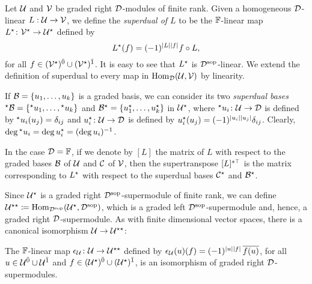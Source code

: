 \begin{defi}\label{defi:superdual-map}
    Let $\mathcal U$ and $\mathcal V$ be graded right $\mathcal{D}$-modules of finite rank. 
    Given a homogeneous $\mathcal{D}$-linear
    $L:\mathcal U \rightarrow \mathcal V$, we define the \emph{superdual of $L$} to be the $\mathbb{F}$-linear map $L^\star\colon \mathcal V^\star \rightarrow \mathcal U^\star$ defined by
    \[
        L^\star (f) = (-1)^{|L||f|} f \circ L,
    \] 
    for all $f\in (\mathcal V^\star)^{\bar0} \cup (\mathcal V^\star)^{\bar1}$. 
    It is easy to see that $L^\star$ is $\mathcal{D}^{\mathrm{sop}}$-linear. 
    We extend the definition of superdual to every map in $\operatorname{Hom}_{\mathcal{D}} (\mathcal U, \mathcal V)$ by linearity.
\end{defi}

\begin{defi}\label{defi:two-dual-bases}
    If $\mathcal B = \{u_1, \ldots, u_k\}$ is a graded basis, we can consider its two \emph{superdual bases} ${}^\star \mathcal B = \{{}^\star u_1, \ldots, {}^\star u_k\}$ and $\mathcal B^\star = \{u_1^\star, \ldots, u_k^\star\}$ in $\mathcal U^\star$, where ${}^\star u_i \colon \mathcal U \rightarrow \mathcal{D}$ is defined by ${}^\star u_i(u_j) = \delta_{ij}$ and $u_i^\star \colon \mathcal U \rightarrow \mathcal{D}$ is defined by $u_i^\star (u_j) = (-1)^{|u_i||u_j|} \delta_{ij}$. 
    Clearly, $\deg {}^\star u_i = \deg  u_i^\star = (\deg u_i)^{-1}$. 
\end{defi}

\begin{remark}
	In the case $\mathcal{D}=\mathbb{F}$, if we denote by $[L]$ the matrix of $L$ with respect to the graded bases $\mathcal B$ of $\mathcal U$ and $\mathcal C$ of $\mathcal V$, then the supertranspose $[L]^{s\top}$ is the matrix corresponding to $L^\star$ with respect to the superdual bases $\mathcal C^\star$ and $\mathcal B^\star$.
\end{remark}

Since $\mathcal U^\star$ is a graded right $\mathcal{D}^{\mathrm{sop}}$-supermodule of finite rank, we can define $\mathcal U^{\star\star} \coloneqq \operatorname{Hom}_{\mathcal{D}^{\mathrm{sop}}} (\mathcal U^\star, \mathcal{D}^{\mathrm{sop}})$, which is a graded left $\mathcal{D}^{\mathrm{sop}}$-supermodule and, hence, a graded right $\mathcal{D}$-supermodule. 
As with finite dimensional vector spaces, there is a canonical isomorphism $\mathcal U \to \mathcal U^{\star\star}$: 

\begin{lemma}\label{lemma:double-dual}
    The $\mathbb{F}$-linear map $\epsilon_\mathcal U\colon \mathcal U \to \mathcal U^{\star\star}$ defined by $\epsilon_\mathcal U(u)(f) = (-1)^{|u||f|}\, \overline{f(u)}$, for all $u \in \mathcal U^{\bar0} \cup \mathcal U^{\bar1}$ and $f \in (\mathcal U^\star)^{\bar0} \cup (\mathcal U^\star)^{\bar1}$, is an isomorphism of graded right $\mathcal{D}$-supermodules. 
\end{lemma}

